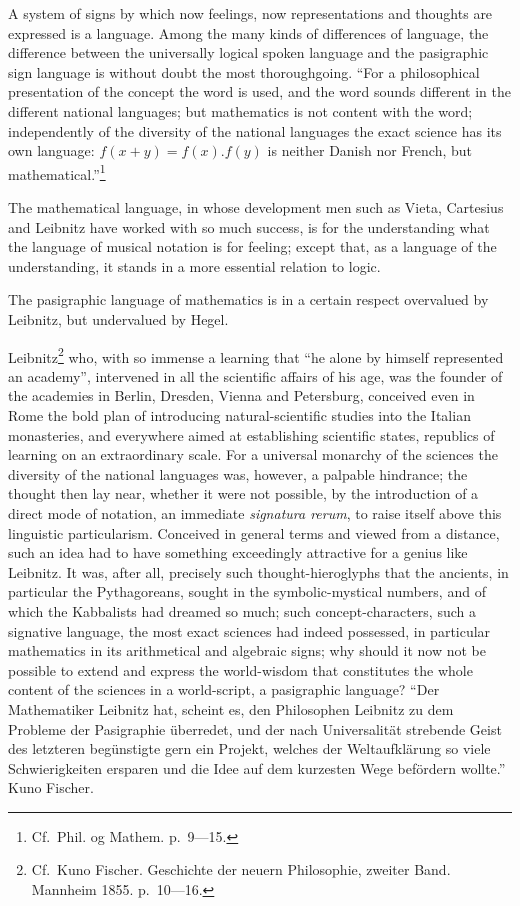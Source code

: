 \documentclass[12pt,a4paper,openany]{book}
\newcommand{\opage}[1]{\marginnote{\footnotesize\textit{[#1]}}}
\begin{document}
A system of signs by which now feelings, now representations
and thoughts are expressed is a language. Among the
many kinds of differences of language, the difference between
the universally logical spoken language and the pasigraphic sign language is without
doubt the most thoroughgoing. ``For a philosophical presentation
of the concept the word is used, and the word sounds different
in the different national languages; but mathematics is not content
with the word; independently of the diversity of the national languages
the exact science has its own language: $f(x + y) = f(x). f(y)$ is neither Danish nor French, but mathematical.''\footnote[1]{Cf.\ Phil. og Mathem. p.\ 9—15.}

The mathematical language, in whose development men
such as Vieta, Cartesius and Leibnitz have worked with so much
success, is for the understanding what the language of musical notation is for feeling;
except that, as a language of the understanding, it stands in a more essential
relation to logic. %

The pasigraphic language of mathematics is in a certain respect
overvalued by Leibnitz, but undervalued by Hegel.

Leibnitz\footnote[2]{Cf.\ Kuno Fischer. Geschichte der neuern Philosophie, zweiter Band. Mannheim 1855. p.\ 10—16.} who, with so immense a learning that ``he
alone by himself represented an academy'', intervened in all the scientific
affairs of his age, was the founder of the academies
in Berlin, Dresden, Vienna and Petersburg, conceived
even in Rome the bold plan of introducing natural-scientific
studies into the Italian monasteries, and everywhere aimed
at establishing scientific states, republics of learning on an
extraordinary scale. For a universal monarchy of the sciences
the diversity of the national languages was, however, a
palpable hindrance; the thought then lay near, whether it were not
possible, by the introduction of a direct mode of notation,
\setcounter{footnote}{0}%
\opage{22}an immediate \textit{signatura rerum}, to raise itself above this
linguistic particularism. Conceived in general terms and viewed
from a distance, such an idea had to have something exceedingly
attractive for a genius like Leibnitz. It was, after all,
precisely such thought-hieroglyphs that the ancients, in particular the Pythagoreans,
sought in the symbolic-mystical numbers, and of which the Kabbalists
had dreamed so much; such concept-characters,
such a signative language, the most exact sciences had indeed possessed,
in particular mathematics in its arithmetical and algebraic
signs; why should it now not be possible to extend
and express the world-wisdom that constitutes the whole
content of the sciences in a world-script, a pasigraphic
language? ``Der Mathematiker Leibnitz hat, scheint es, den
Philosophen Leibnitz zu dem Probleme der Pasigraphie überredet,
und der nach Universalität strebende Geist des letzteren
begünstigte gern ein Projekt, welches der Weltaufklärung so
viele Schwierigkeiten ersparen und die Idee auf dem kurzesten
Wege befördern wollte.'' Kuno Fischer.
\end{document}
